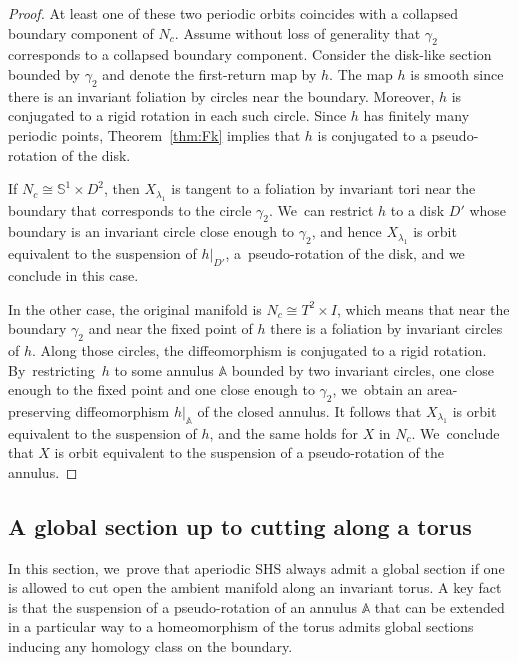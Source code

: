 \documentclass[JEP,XML,SOM,Unicode,NoEqCountersInSection,NoFloatCountersInSection,published]{cedram}
\theoremstyle{definition}
\newcommand{\mS}{\mathbb{S}}
\begin{document}
\begin{proof}
At least one of these two periodic orbits coincides with a collapsed boundary component of $N_c$. Assume without loss of generality that $\gamma_2$ corresponds to a collapsed boundary component. Consider the disk-like section bounded by $\gamma_2$ and denote the first-return map by $h$. The map $h$ is smooth since there is an invariant foliation by circles near the boundary. Moreover, $h$ is conjugated to a rigid rotation in each such circle. Since $h$ has finitely many periodic points, Theorem~\ref{thm:Fk} implies that $h$ is conjugated to a pseudo-rotation of the disk.\enlargethispage{-.5\baselineskip}

If $N_c\cong \mS^1\times D^2$, then $X_{\lambda_1}$ is tangent to a foliation by invariant tori near the boundary that corresponds to the circle $\gamma_2$. We~can restrict $h$ to a disk $D'$ whose boundary is an invariant circle close enough to $\gamma_2$, and hence $X_{\lambda_1}$ is orbit equivalent to the suspension of $h|_{D'}$, a~pseudo-rotation of the disk, and we conclude in this case.

In the other case, the original manifold is $N_c\cong T^2\times I$, which means that near the boundary $\gamma_2$ and near the fixed point of $h$ there is a foliation by invariant circles of $h$. Along those circles, the diffeomorphism is conjugated to a rigid rotation. By~restricting~$h$ to some annulus $\mathbb{A}$ bounded by two invariant circles, one close enough to the fixed point and one close enough to $\gamma_2$, we~obtain an area-preserving diffeomorphism $h|_\mathbb{A}$
of the closed annulus. It follows that $X_{\lambda_1}$ is orbit equivalent to the suspension of $h$, and the same holds for $X$ in $N_c$. We~conclude that $X$ is orbit equivalent to the suspension of a pseudo-rotation of the annulus.
\end{proof}

\subsection{A global section up to cutting along a torus}

In this section, we~prove that aperiodic SHS always admit a global section if one is allowed to cut open the ambient manifold along an invariant torus. A key fact is that the suspension of a pseudo-rotation of an annulus $\mathbb{A}$ that can be extended in a particular way to a homeomorphism of the torus admits global sections inducing any homology class on the boundary.
\end{document}
